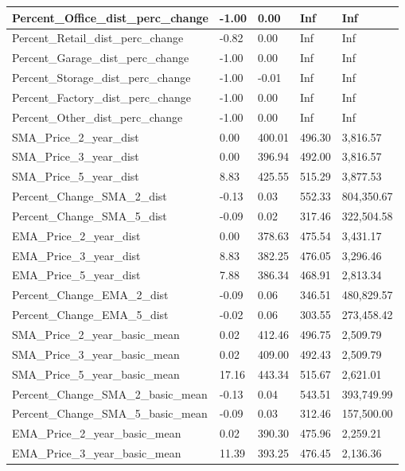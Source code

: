\documentclass[12pt,]{article}
\begin{document}
\begin{table}
{\begin{tabular}[t]{l|l|l|l|l}
\hline
Percent\_Office\_dist\_perc\_change & -1.00 & 0.00 & Inf & Inf\\
\hline
Percent\_Retail\_dist\_perc\_change & -0.82 & 0.00 & Inf & Inf\\
\hline
Percent\_Garage\_dist\_perc\_change & -1.00 & 0.00 & Inf & Inf\\
\hline
Percent\_Storage\_dist\_perc\_change & -1.00 & -0.01 & Inf & Inf\\
\hline
Percent\_Factory\_dist\_perc\_change & -1.00 & 0.00 & Inf & Inf\\
\hline
Percent\_Other\_dist\_perc\_change & -1.00 & 0.00 & Inf & Inf\\
\hline
SMA\_Price\_2\_year\_dist & 0.00 & 400.01 & 496.30 & 3,816.57\\
\hline
SMA\_Price\_3\_year\_dist & 0.00 & 396.94 & 492.00 & 3,816.57\\
\hline
SMA\_Price\_5\_year\_dist & 8.83 & 425.55 & 515.29 & 3,877.53\\
\hline
Percent\_Change\_SMA\_2\_dist & -0.13 & 0.03 & 552.33 & 804,350.67\\
\hline
Percent\_Change\_SMA\_5\_dist & -0.09 & 0.02 & 317.46 & 322,504.58\\
\hline
EMA\_Price\_2\_year\_dist & 0.00 & 378.63 & 475.54 & 3,431.17\\
\hline
EMA\_Price\_3\_year\_dist & 8.83 & 382.25 & 476.05 & 3,296.46\\
\hline
EMA\_Price\_5\_year\_dist & 7.88 & 386.34 & 468.91 & 2,813.34\\
\hline
Percent\_Change\_EMA\_2\_dist & -0.09 & 0.06 & 346.51 & 480,829.57\\
\hline
Percent\_Change\_EMA\_5\_dist & -0.02 & 0.06 & 303.55 & 273,458.42\\
\hline
SMA\_Price\_2\_year\_basic\_mean & 0.02 & 412.46 & 496.75 & 2,509.79\\
\hline
SMA\_Price\_3\_year\_basic\_mean & 0.02 & 409.00 & 492.43 & 2,509.79\\
\hline
SMA\_Price\_5\_year\_basic\_mean & 17.16 & 443.34 & 515.67 & 2,621.01\\
\hline
Percent\_Change\_SMA\_2\_basic\_mean & -0.13 & 0.04 & 543.51 & 393,749.99\\
\hline
Percent\_Change\_SMA\_5\_basic\_mean & -0.09 & 0.03 & 312.46 & 157,500.00\\
\hline
EMA\_Price\_2\_year\_basic\_mean & 0.02 & 390.30 & 475.96 & 2,259.21\\
\hline
EMA\_Price\_3\_year\_basic\_mean & 11.39 & 393.25 & 476.45 & 2,136.36\\

\end{tabular}}
\end{table}
\end{document}
